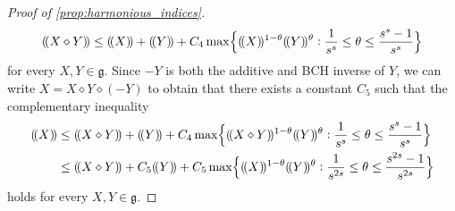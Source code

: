\documentclass[11pt]{article}
\numberwithin{equation}{section}
\theoremstyle{plain}
\theoremstyle{definition}
\theoremstyle{remark}
\numberwithin{equation}{section}
\numberwithin{equation}{section}
\DeclarePairedDelimiter\pnorm{(\!(}{)\!)}
\begin{document}
\begin{proof}[Proof of \cref{prop:harmonious_indices}]
\begin{equation}
\pnorm{X\diamond Y} \leq \pnorm{X}+\pnorm{Y} + C_4\max\Bigl\{\pnorm{X}^{1-\theta}\pnorm{Y}^{\theta}: \frac{1}{s^s} \leq \theta \leq \frac{s^s-1}{s^s} \Bigr\}
\end{equation}
for every $X,Y\in \mathfrak{g}$.  Since $-Y$ is both the additive and BCH inverse of $Y$, we can write $X=X \diamond Y \diamond (-Y)$ to obtain that there exists a constant $C_5$ such that the complementary inequality 
\begin{align}
\pnorm{X} &\leq \pnorm{X\diamond Y}+ \pnorm{Y} + C_4\max\Bigl\{\pnorm{X \diamond Y}^{1-\theta}\pnorm{Y}^{\theta}: \frac{1}{s^s} \leq \theta \leq \frac{s^s-1}{s^s} \Bigr\}
\nonumber
\\
&\leq \pnorm{X\diamond Y}+ C_5\pnorm{Y} + C_5 \max\Bigl\{\pnorm{X}^{1-\theta}\pnorm{Y}^{\theta}: \frac{1}{s^{2s}} \leq \theta \leq \frac{s^{2s}-1}{s^{2s}} \Bigr\}
\label{eq:pnorm_BCH_reverse_triangle}
\end{align}
holds for every $X,Y\in \mathfrak{g}$. 
%
%
%
%
%

\medskip


\end{proof}
\end{document}
